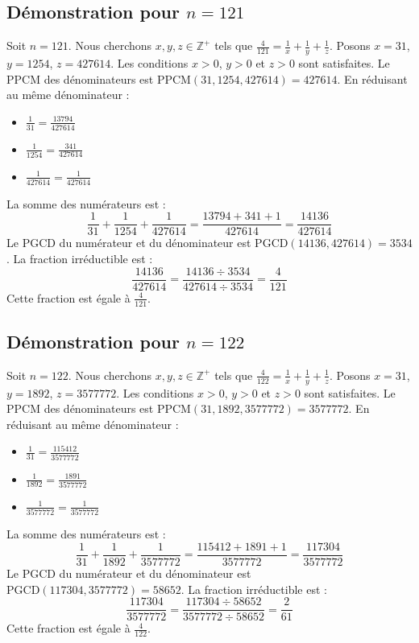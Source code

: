 \documentclass[11pt,a4paper]{article}
\begin{document}
\subsection{Démonstration pour $n = 121$}
Soit $n = 121$. Nous cherchons $x, y, z \in \mathbb{Z}^{+}$ tels que $\frac{4}{121} = \frac{1}{x} + \frac{1}{y} + \frac{1}{z}$.
Posons $x = 31$, $y = 1254$, $z = 427614$.
Les conditions $x > 0$, $y > 0$ et $z > 0$ sont satisfaites.
Le PPCM des dénominateurs est $\text{PPCM}(31, 1254, 427614) = 427614$.
En réduisant au même dénominateur :
\begin{itemize}
    \item $\frac{1}{31} = \frac{13794}{427614}$
    \item $\frac{1}{1254} = \frac{341}{427614}$
    \item $\frac{1}{427614} = \frac{1}{427614}$
\end{itemize}
La somme des numérateurs est :
$$ \frac{1}{31} + \frac{1}{1254} + \frac{1}{427614} = \frac{13794 + 341 + 1}{427614} = \frac{14136}{427614} $$
Le PGCD du numérateur et du dénominateur est $\text{PGCD}(14136, 427614) = 3534$.
La fraction irréductible est :
$$ \frac{14136}{427614} = \frac{14136 \div 3534}{427614 \div 3534} = \frac{4}{121} $$
Cette fraction est égale à $\frac{4}{121}$.

\subsection{Démonstration pour $n = 122$}
Soit $n = 122$. Nous cherchons $x, y, z \in \mathbb{Z}^{+}$ tels que $\frac{4}{122} = \frac{1}{x} + \frac{1}{y} + \frac{1}{z}$.
Posons $x = 31$, $y = 1892$, $z = 3577772$.
Les conditions $x > 0$, $y > 0$ et $z > 0$ sont satisfaites.
Le PPCM des dénominateurs est $\text{PPCM}(31, 1892, 3577772) = 3577772$.
En réduisant au même dénominateur :
\begin{itemize}
    \item $\frac{1}{31} = \frac{115412}{3577772}$
    \item $\frac{1}{1892} = \frac{1891}{3577772}$
    \item $\frac{1}{3577772} = \frac{1}{3577772}$
\end{itemize}
La somme des numérateurs est :
$$ \frac{1}{31} + \frac{1}{1892} + \frac{1}{3577772} = \frac{115412 + 1891 + 1}{3577772} = \frac{117304}{3577772} $$
Le PGCD du numérateur et du dénominateur est $\text{PGCD}(117304, 3577772) = 58652$.
La fraction irréductible est :
$$ \frac{117304}{3577772} = \frac{117304 \div 58652}{3577772 \div 58652} = \frac{2}{61} $$
Cette fraction est égale à $\frac{4}{122}$.
\end{document}
